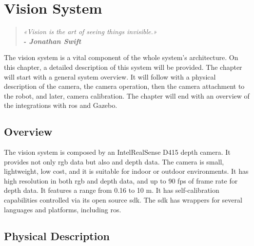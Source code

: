\chapter{Vision System}
\label{cha:vision_system}

\begin{quotation}
\begin{flushright}
\itshape
«Vision is the art of seeing things invisible.»\\
\textbf{- Jonathan Swift}
\end{flushright}
\end{quotation}

The vision system is a vital component of the whole system's architecture. On this chapter, a detailed description of this system will be provided. The chapter will start with a general system overview. It will follow with a physical description of the camera, the camera operation, then the camera attachment to the robot, and later, camera calibration. The chapter will end with an overview of the integrations with \gls{ros} and Gazebo.


\section{Overview}
\label{sec:vision_system_overview}

The vision system is composed by an Intel\textregistered RealSense\texttrademark{} D415 depth camera. It provides not only \gls{rgb} data but also  and depth data. The camera is small, lightweight, low cost, and it is suitable for indoor or outdoor environments. It has high resolution in both \gls{rgb} and depth data, and up to 90 \gls{fps} of frame rate for depth data. It features a range from 0.16 to 10 \si{\meter}. It has self-calibration capabilities controlled via its open source \gls{sdk}. The \gls{sdk} has wrappers for several languages and platforms, including \gls{ros}.



\section{Physical Description}
\label{sec:vision_system_physical_description}

